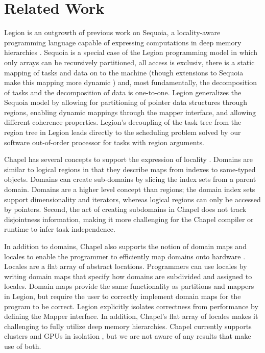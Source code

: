 
\section{Related Work}
\label{sec:related}

Legion is an outgrowth of previous work on Sequoia, a locality-aware programming language capable
of expressing computations in deep memory hierarchies
\cite{Fatahalian06}.  Sequoia is a special case of the Legion
programming model in which only arrays can be recursively partitioned,
all access is exclusiv, there is a static mapping of tasks and data on to the machine (though
extensions to Sequoia make this mapping more dynamic \cite{BCSA11}) and, most fundamentally, the decomposition of tasks and the decomposition
of data is one-to-one.  Legion generalizes the Sequoia model by allowing for
partitioning of pointer data structures through regions, enabling dynamic mappings through
the mapper interface, and allowing different coherence
properties.  Legion's decoupling of the task tree from the region tree in Legion leads directly to the scheduling problem solved by our software out-of-order processor for tasks with region arguments.

Chapel has several concepts to support the expression of locality \cite{Chamberlain:Chapel}.
Domains are similar to logical regions in that they describe maps from indexes
to same-typed objects.  Domains can create sub-domains by slicing the index sets from
a parent domain.  Domains are a higher level concept than regions; the domain index sets 
support dimensionality and iterators, whereas  logical regions can only be accessed by pointers.  
Second, the act of creating subdomains in Chapel does not track disjointness information,
making it more challenging for the Chapel compiler or runtime to infer task independence.

In addition to domains, Chapel also supports the notion of domain maps and locales to enable 
the programmer to efficiently map domains onto hardware \cite{CHAPEL11}.  Locales are a flat array
of abstract locations.  Programmers can use locales by writing domain maps that specify
how domains are subdivided and assigned to locales.  Domain maps provide the same functionality
as partitions and mappers in Legion, but require the user to correctly implement domain
maps for the program to be correct.  Legion explicitly isolates correctness
from performance by defining the Mapper interface.  In addition, Chapel's flat array of locales
makes it challenging to fully utilize deep memory hierarchies.  Chapel currently supports
clusters and GPUs in isolation \cite{CHAPELGPU}, but we are not aware of any results that 
make use of both.

